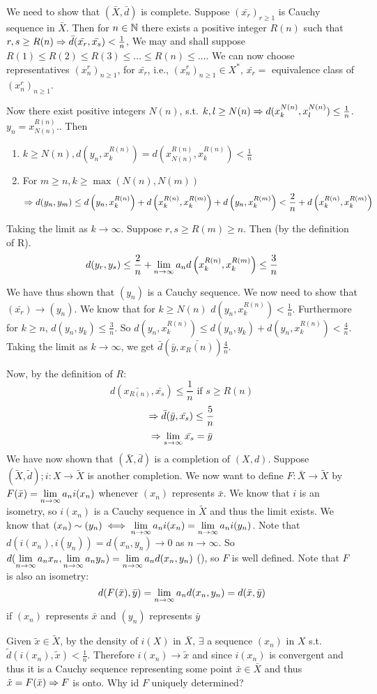 We need to show that $(\bar{X},\bar{d})$ is complete.
Suppose $(\bar{x_r})_{r\geq 1}$ is Cauchy sequence in $\bar{X}$.
Then for $n\in\mathbb{N}$ there exists a positive integer $R(n)$ such that $r,s\geq R(n)\Rightarrow \bar{d}(\bar{x_r},\bar{x_s})<\frac{1}{n}$,
We may and shall suppose $R(1)\leq R(2) \leq R(3) \leq \ldots \leq R(n) \leq \ldots$. We can now choose representatives $(x_n^r)_{n\geq1}$, for $\bar{x_r}$, i.e., $(x_n^r)_{n\geq1}\in X^*$, $\bar{x_r} = $ equivalence class of $(x_n^r)_{n\geq1}$. \par
Now there exist positive integers $N(n)$, s.t. $k,l\geq N(n)\Rightarrow d(x_k^{N(n)},x_l^{N(n)})\leq \frac{1}{n}$.
 $y_n=x_{N(n)}^{R(n)}.$. Then 
\begin{enumerate}
\item $k\geq N(n), d(y_n,x_k^{R(n)})=d(x_{N(n)}^{R(n)},x_k^{R(n)})<\frac{1}{n}$
\item For $m \geq n, k\geq \max(N(n),N(m))$
\[ \Rightarrow d(y_n,y_m) \leq d\left(y_n,x_k^{R(n)}\right) + d\left(x_k^{R(n)},x_k^{R(m)}\right) + d\left(y_n,x_k^{R(m)}\right) < \frac{2}{n} + d\left(x_k^{R(n)},x_k^{R(m)}\right) \]
\end{enumerate}
Taking the limit as $k\to\infty$. Suppose $r,s\geq R(m)\geq n$. Then (by the definition of R).
\[ d(y_r,y_s) \leq \frac{2}{n}+\lim\limits_{n\to\infty} a_n d\left(x_k^{R(n)},x_k^{R(m)}\right) \leq \frac{3}{n} \]
\par
We have thus shown that $(y_n)$ is a Cauchy sequence. We now need to show that $(\bar{x_r})\to (y_n)$.
We know that for $k\geq N(n)$ $d(y_n,x_k^{R(n)})<\frac{1}{n}$. Furthermore for $k \geq n$, $d(y_n,y_k)\leq \frac{3}{n}$. So $d(y_n, x_k^{R(n)})\leq d(y_n,y_k) + d(y_n,x_k^{R(n)}) < \frac{4}{n}$. Taking the limit as $k \to\infty$, we get $\bar{d}(\bar{y},\bar{x_R(n)})\frac{4}{n}$. \par
Now, by the definition of $R$:
\[ d(\bar{x_{R(n)}},\bar{x_s}) \leq \frac{1}{n} \text{ if } s\geq R(n) \]
\[ \Rightarrow \bar{d}(\bar{y},\bar{x_s})\leq\frac{5}{n} \]
\[ \Rightarrow \lim\limits_{s\to\infty} \bar{x_s}=\bar{y} \]
We have now shown that $(\bar{X},\bar{d})$ is a completion of $(X,d)$. Suppose $(\tilde{X},\tilde{d}); i:X\to\tilde{X}$ is another completion. We now want to define $F: \bar{X} \to \tilde{X}$ by $F(\bar{x}) = \lim\limits_{n\to\infty} a_n i(x_n)$ whenever $(x_n)$ represents $\bar{x}$. We know that $i$ is an isometry, so $i(x_n)$ is a Cauchy sequence in $\tilde{X}$ and thus the limit exists.
We know that $(x_n)\sim (y_n) \iff \lim\limits_{n\to\infty} a_n i(x_n) = \lim\limits_{n\to\infty} a_n i(y_n)$.
Note that $d(i(x_n),i(y_n))=d(x_n,y_n)\to 0$ as $n\to\infty$.
So $d(\lim\limits_{n\to\infty} a_n x_n,\lim\limits_{n\to\infty} a_n y_n)=\lim\limits_{n\to\infty} a_n d(x_n,y_n)$ (), so $F$ is well defined. Note that $F$ is also an isometry:
\[ d(F(\bar{x}),\bar{y})=\lim\limits_{n\to\infty} a_n d(x_n,y_n)=d(\bar{x},\bar{y}) \]
if $(x_n)$ represents $\bar{x}$ and $(y_n)$ represents $\bar{y}$
\par
Given $\tilde{x}\in \tilde{X}$, by the density of $i(X)$  in $\bar{X}$, $\exists$ a sequence $(x_n)$ in $X$ s.t. $\tilde{d}(i(x_n),\tilde{x})<\frac{1}{n}$. Therefore $i(x_n)\to\tilde{x}$ and since $i(x_n)$ is convergent and thus it is a Cauchy sequence representing some point $\bar{x}\in \bar{X}$ and thus $\tilde{x}=F(\bar{x})\Rightarrow F$ is onto. Why id $F$ uniquely determined?
